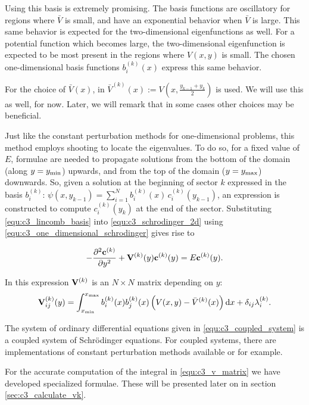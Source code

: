 Using this basis is extremely promising. The basis functions are oscillatory for regions where $\bar{V}$ is small, and have an exponential behavior when $\bar{V}$ is large. This same behavior is expected for the two-dimensional eigenfunctions as well. For a potential function which becomes large, the two-dimensional eigenfunction is expected to be most present in the regions where $V(x, y)$ is small. The chosen one-dimensional basis functions $b_i^{(k)}(x)$ express this same behavior.

For the choice of $\bar{V}(x)$, in \cite{ixaru_new_2010} $\bar{V}^{(k)}(x) := V\left(x, \frac{y_{k-1} + y_k}{2}\right)$ is used. We will use this as well, for now. Later, we will remark that in some cases other choices may be beneficial.

Just like the constant perturbation methods for one-dimensional problems, this method employs shooting to locate the eigenvalues. To do so, for a fixed value of $E$, formulae are needed to propagate solutions from the bottom of the domain (along $y = {y_{\text{min}}}$) upwards, and from the top of the domain ($y = {y_{\text{max}}}$) downwards. So, given a solution at the beginning of sector $k$ expressed in the basis $b_i^{(k)}$: $ \psi(x, y_{k-1}) = \sum_{i=1}^{N} b_i^{(k)}(x)\, c_i^{(k)}(y_{k-1}) $, an expression is constructed to compute $c^{(k)}_i(y_k)$ at the end of the sector. Substituting \eqref{equ:c3_lincomb_basis} into \eqref{equ:c3_schrodinger_2d} using \eqref{equ:c3_one_dimensional_schrodinger} gives rise to

\begin{equation}\label{equ:c3_coupled_system}
  -\pdv[2]{\vb{c}^{(k)}}{y} + \vb{V}^{(k)}(y) \vb{c}^{(k)}(y) = E \vb{c}^{(k)}(y) \text{.}
\end{equation}

In this expression $\vb{V}^{(k)}$ is an $N\times N$ matrix depending on $y$:
\begin{equation}\label{equ:c3_v_matrix}
  \vb{V}^{(k)}_{ij}(y) = \int_{{x_{\text{min}}}}^{{x_{\text{max}}}} b_i^{(k)}(x) b_j^{(k)}(x) \left(V(x, y) - \bar{V}^{(k)}(x)\right) \dd x + \delta_{ij} \lambda_i^{(k)} \text{.}
\end{equation}

The system of ordinary differential equations given in \eqref{equ:c3_coupled_system} is a coupled system of Schrö\-dinger equations. For coupled systems, there are implementations of constant perturbation methods available \lilix{} \cite{ixaru_lilix_2002} or \matscs{} \cite{ledoux_numerical_2007} for example.

For the accurate computation of the integral in \eqref{equ:c3_v_matrix} we have developed specialized formulae. These will be presented later on in section \ref{sec:c3_calculate_vk}.


